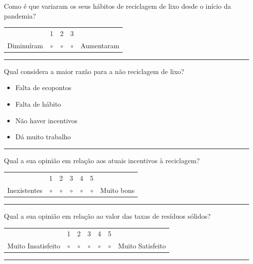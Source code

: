 \documentclass[11pt, a4paper, oneside]{book}
\begin{document}
\begin{appendices}
\begin{mdframed}[innerleftmargin=7.5mm, innerrightmargin=7.5mm, innertopmargin=7.5mm, innerbottommargin=7.5mm]
Como é que variaram os seus hábitos de reciclagem de lixo desde o início da pandemia?
\begin{center}
    \begin{tabular}{l c c c r}
         & 1 & 2 & 3 & \\[0.5em]
         Diminuíram & {\huge$\circ$} & {\huge$\circ$} & {\huge$\circ$} & Aumentaram
    \end{tabular}
\end{center}
\vspace{-0.1em}\rule{\linewidth}{0.5pt}\vspace{0.5em}

Qual considera a maior razão para a não reciclagem de lixo?
\begin{itemize}[label={\huge $\circ$}]
    \itemsep0em
    \item Falta de ecopontos
    \item Falta de hábito
    \item Não haver incentivos
    \item Dá muito trabalho
\end{itemize}
\vspace{-0.7em}\rule{\linewidth}{0.5pt}\vspace{0.5em}

Qual a sua opinião em relação aos atuais incentivos à reciclagem?
\begin{center}
    \begin{tabular}{l c c c c c r}
         & 1 & 2 & 3 & 4 & 5 & \\[0.5em]
         Inexistentes & {\huge$\circ$} & {\huge$\circ$} & {\huge$\circ$} & {\huge$\circ$} & {\huge$\circ$} & Muito bons
    \end{tabular}
\end{center}
\vspace{-0.1em}\rule{\linewidth}{0.5pt}\vspace{0.5em}

Qual a sua opinião em relação ao valor das taxas de resíduos sólidos?
\begin{center}
    \begin{tabular}{l c c c c c r}
         & 1 & 2 & 3 & 4 & 5 & \\[0.5em]
         Muito Insatisfeito & {\huge$\circ$} & {\huge$\circ$} & {\huge$\circ$} & {\huge$\circ$} & {\huge$\circ$} & Muito Satisfeito
    \end{tabular}
\end{center}
\vspace{-0.1em}\rule{\linewidth}{0.5pt}\vspace{0.5em}


\end{mdframed}
\end{appendices}
\end{document}
